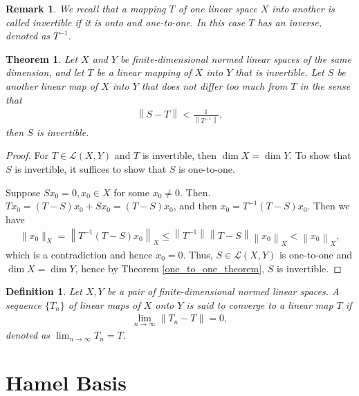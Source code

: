 \documentclass[11pt]{book}
\newtheorem{definition}{Definition}[chapter]
\newtheorem{theorem}{Theorem}[chapter]
\newtheorem{remark}{Remark}[chapter]
\theoremstyle{definition}
\numberwithin{equation}{chapter}
\begin{document}
\begin{remark}
We recall that a mapping $T$ of one linear space $X$ into another is called invertible if it is onto and one-to-one. In this case $T$ has an inverse, denoted as $T^{-1}$.
\end{remark}

\medskip

\begin{theorem}
Let $X$ and $Y$ be finite-dimensional normed linear spaces of the same dimension, and let $T$ be a linear mapping of $X$ into $Y$ that is invertible. Let $S$ be another linear map of $X$ into $Y$ that does not differ too much from $T$ in the sense that
\begin{align*}
    \left\|S - T\right\| < \frac{1}{\left\|T^{-1}\right\|},
\end{align*}
then $S$ is invertible.
\end{theorem}
\begin{proof}
For $T \in \mathscr{L}(X, Y)$ and $T$ is invertible, then $\dim  X = \dim  Y$. To show that $S$ is invertible, it suffices to show that $S$ is one-to-one.

Suppose $Sx_0 = 0, x_0 \in X$ for some $x_0 \neq 0$. Then. $Tx_0 = (T - S)x_0 + Sx_0 = (T - S)x_0$, and then $x_0 = T^{-1} (T - S)x_0$. Then we have
\begin{align*}
    \|x_0\|_X = \left\|T^{-1}(T - S)x_0\right\|_X \leq \left\|T^{-1}\right\| \left\|T - S\right\| \left\| x_0\right\|_X < \left\| x_0\right\|_X,
\end{align*}
which is a contradiction and hence $x_0 = 0$. Thus, $S \in \mathscr{L}(X,Y)$ is one-to-one and $\dim  X = \dim  Y$, hence by Theorem \ref{one_to_one_theorem}, $S$ is invertible.
\end{proof}

\medskip

\begin{definition}
Let $X, Y$ be a pair of finite-dimensional normed linear spaces. A sequence $\{T_n\}$ of linear maps of $X$ onto $Y$ is said to converge to a linear map $T$ if 
\begin{align*}
    \lim_{n \to \infty} \left\|T_n - T\right\| = 0,
\end{align*}
denoted as $\lim_{n \to \infty} T_n = T$.
\end{definition}

\medskip

\section{Hamel Basis}
\end{document}
